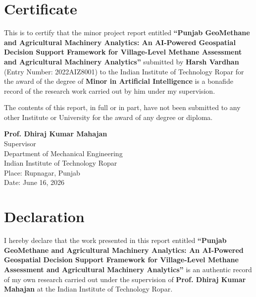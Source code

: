 \documentclass[12pt,a4paper]{report}
\begin{document}

\chapter*{Certificate}
This is to certify that the minor project report entitled \textbf{``Punjab GeoMethane and Agricultural Machinery Analytics: An AI-Powered Geospatial Decision Support Framework for Village-Level Methane Assessment and Agricultural Machinery Analytics''} submitted by \textbf{Harsh Vardhan} (Entry Number: 2022AIZ8001) to the Indian Institute of Technology Ropar for the award of the degree of \textbf{Minor in Artificial Intelligence} is a bonafide record of the research work carried out by him under my supervision. 

The contents of this report, in full or in part, have not been submitted to any other Institute or University for the award of any degree or diploma.

\vspace{2.5cm}

\noindent
\textbf{Prof. Dhiraj Kumar Mahajan} \\
Supervisor \\
Department of Mechanical Engineering \\
Indian Institute of Technology Ropar \\
Place: Rupnagar, Punjab \\
Date: June 16, 2026

\chapter*{Declaration}
I hereby declare that the work presented in this report entitled \textbf{``Punjab GeoMethane and Agricultural Machinery Analytics: An AI-Powered Geospatial Decision Support Framework for Village-Level Methane Assessment and Agricultural Machinery Analytics''} is an authentic record of my own research carried out under the supervision of \textbf{Prof. Dhiraj Kumar Mahajan} at the Indian Institute of Technology Ropar. 
\end{document}
